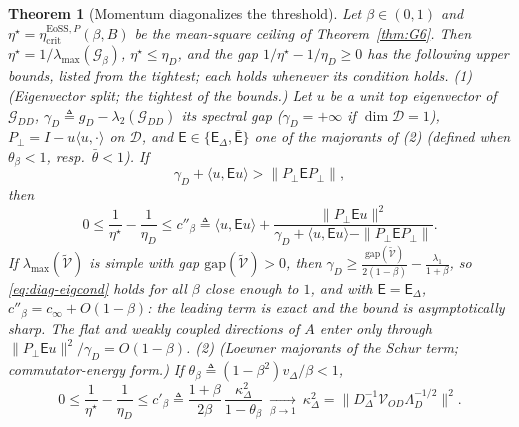 \documentclass[11pt]{article}
\newtheorem{theorem}{Theorem}
\theoremstyle{remark}
\newcommand{\etacrit}{\eta_{\mathrm{crit}}}
\begin{document}
\begin{theorem}[Momentum diagonalizes the threshold]\label{thm:diag-threshold}
Let $\beta\in(0,1)$ and $\eta^\star=\etacrit^{\mathrm{EoSS},P}(\beta,B)$ be the mean-square ceiling of Theorem~\ref{thm:G6}. Then $\eta^\star=1/\lambda_{\max}(\mathcal G_\beta)$, $\eta^\star\le\eta_D$, and the gap $1/\eta^\star-1/\eta_D\ge0$ has the following upper bounds, listed from the tightest; each holds whenever its condition holds.
(1) (Eigenvector split; the tightest of the bounds.) Let $u$ be a unit top eigenvector of $\mathcal G_{DD}$, $\gamma_D\triangleq g_D-\lambda_2(\mathcal G_{DD})$ its spectral gap ($\gamma_D=+\infty$ if $\dim\mathcal D=1$), $P_\perp=I-u\langle u,\cdot\rangle$ on $\mathcal D$, and $\mathsf E\in\{\mathsf E_\Delta,\bar{\mathsf E}\}$ one of the majorants of (2) (defined when $\theta_\beta<1$, resp.\ $\bar\theta<1$). If
\begin{equation}\label{eq:diag-eigcond}
\gamma_D+\langle u,\mathsf Eu\rangle>\|P_\perp\mathsf EP_\perp\|,
\end{equation}
then
\[
0\le\frac1{\eta^\star}-\frac1{\eta_D}\le c''_\beta\triangleq\langle u,\mathsf Eu\rangle+\frac{\|P_\perp\mathsf Eu\|^2}{\gamma_D+\langle u,\mathsf Eu\rangle-\|P_\perp\mathsf EP_\perp\|}.
\]
If $\lambda_{\max}(\widetilde{\mathcal V})$ is simple with gap $\mathrm{gap}(\widetilde{\mathcal V})>0$, then $\gamma_D\ge\frac{\mathrm{gap}(\widetilde{\mathcal V})}{2(1-\beta)}-\frac{\lambda_1}{1+\beta}$, so \eqref{eq:diag-eigcond} holds for all $\beta$ close enough to $1$, and with $\mathsf E=\mathsf E_\Delta$, $c''_\beta=c_\infty+O(1-\beta)$: the leading term is exact and the bound is asymptotically sharp. The flat and weakly coupled directions of $A$ enter only through $\|P_\perp\mathsf Eu\|^2/\gamma_D=O(1-\beta)$.
(2) (Loewner majorants of the Schur term; commutator-energy form.) If $\theta_\beta\triangleq(1-\beta^2)v_\Delta/\beta<1$,
\[
0\le\frac1{\eta^\star}-\frac1{\eta_D}\le c'_\beta\triangleq\frac{1+\beta}{2\beta}\,\frac{\kappa_\Delta^2}{1-\theta_\beta}\ \xrightarrow[\beta\to1]{}\ \kappa_\Delta^2=\big\|D_\Delta^{-1}\mathcal V_{OD}\Lambda_D^{-1/2}\big\|^2 .
\]

\end{theorem}
\end{document}

